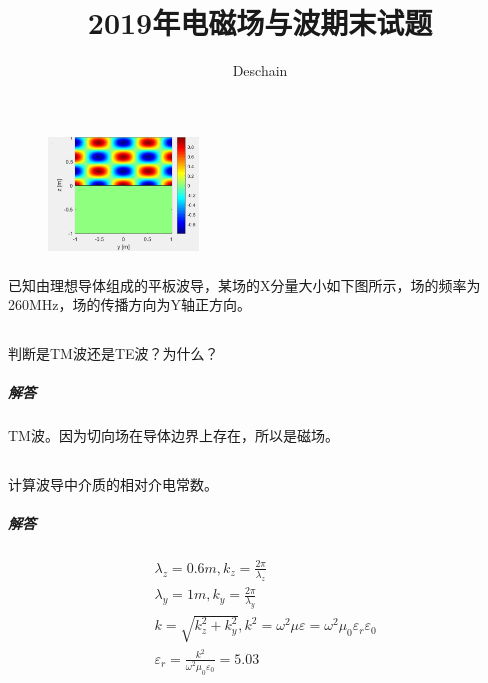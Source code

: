 \documentclass[UTF8]{ctexart}
\title{2019年电磁场与波期末试题}
\author{Deschain}
\begin{document}
\maketitle
\section{}
\begin{figure}
\includegraphics[width=4cm]{2019-1.png}
\end{figure}
\paragraph{}
已知由理想导体组成的平板波导，某场的X分量大小如下图所示，场的频率为260MHz，场的传播方向为Y轴正方向。
\subsection{}
\paragraph{}
判断是TM波还是TE波？为什么？
\subparagraph{解答}
TM波。因为切向场在导体边界上存在，所以是磁场。
\subsection{}
\paragraph{}
计算波导中介质的相对介电常数。
\subparagraph{解答}
\begin{equation*}
\begin{aligned}
&\lambda_z=0.6m,k_z=\frac{2\pi}{\lambda_z}\\
&\lambda_y=1m,k_y=\frac{2\pi}{\lambda_y}\\
&k=\sqrt{k_z^2 + k_y^2},k^2=\omega^2\mu \varepsilon=\omega^2\mu_0\varepsilon_r\varepsilon_0\\
&\varepsilon_r=\frac{k^2}{\omega^2\mu_0\varepsilon_0}=5.03
\end{aligned}
\end{equation*}
\subsection{}
\end{document}
